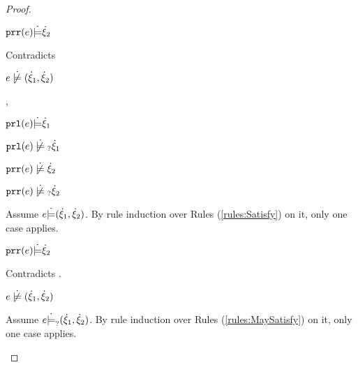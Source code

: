 \begin{proof}
\begin{byCases}
\begin{byCases}
\begin{byCases}
\begin{byCases}
                \begin{pfsteps*}
                \item $\mathtt{prr}(e) \dot{\models} \dot{\xi}_2$ 
                \end{pfsteps*}
                Contradicts 
            \end{byCases}
            \begin{pfsteps*}
            \item $\cnotsatisfy{e}{\cpair{\hxi_1}{\hxi_2}}$  
            \end{pfsteps*}
            
        \item[\csatisfy{\hprl{e}}{\hxi_1},\cnotsatisfyormay{\hprr{e}}{\hxi_2}]
            \begin{pfsteps*}
            \item $\mathtt{prl}(e) \dot{\models} \dot{\xi}_1$  
            \item $\cnotmaysatisfy{\hprl{e}}{\hxi_1}$  
            \item $\cnotsatisfy{\hprr{e}}{\hxi_2}$  
            \item $\cnotmaysatisfy{\hprr{e}}{\hxi_2}$  
            \end{pfsteps*}
            Assume $e \dot{\models} (\dot{\xi}_1 , \dot{\xi}_2)$. By rule induction over Rules (\ref{rules:Satisfy}) on it, only one case applies.
            \begin{byCases}
            \item[\text{(\ref{rule:CSNotIntroPair})}]
                \begin{pfsteps*}
                \item $\mathtt{prr}(e) \dot{\models} \dot{\xi}_2$ 
                \end{pfsteps*}
                Contradicts .
            \end{byCases}
            \begin{pfsteps*}
            \item $\cnotsatisfy{e}{\cpair{\hxi_1}{\hxi_2}}$  
            \end{pfsteps*}
            Assume $e \dot{\models}_{?} (\dot{\xi}_1 , \dot{\xi}_2)$. By rule induction over Rules (\ref{rules:MaySatisfy}) on it, only one case applies.

\end{byCases}
\end{byCases}
\end{byCases}
\end{proof}
